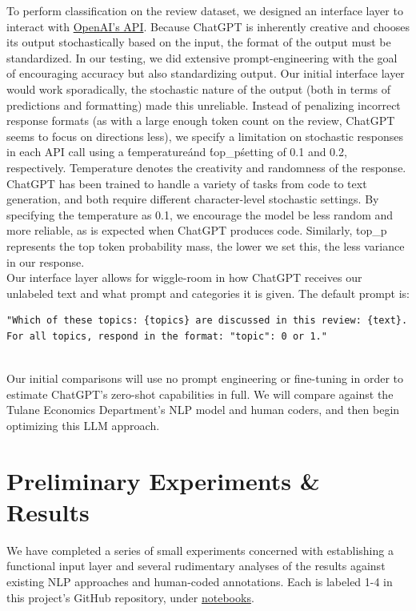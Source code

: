 \documentclass[12pt,a4paper]{article}
\begin{document}
\noindent To perform classification on the review dataset, we designed an interface layer to interact with \href{https://platform.openai.com/docs/overview}{OpenAI's API}. Because ChatGPT is inherently creative and chooses its output stochastically based on the input, the format of the output must be standardized. In our testing, we did extensive prompt-engineering with the goal of encouraging accuracy but also standardizing output. Our initial interface layer would work sporadically, the stochastic nature of the output (both in terms of predictions and formatting) made this unreliable. Instead of penalizing incorrect response formats (as with a large enough token count on the review, ChatGPT seems to focus on directions less), we specify a limitation on stochastic responses in each API call using a \'temperature\' and \'top\_p\' setting of 0.1 and 0.2, respectively. Temperature denotes the creativity and randomness of the response. ChatGPT has been trained to handle a variety of tasks from code to text generation, and both require different character-level stochastic settings. By specifying the temperature as 0.1, we encourage the model be less random and more reliable, as is expected when ChatGPT produces code. Similarly, top\_p represents the top token probability mass, the lower we set this, the less variance in our response. \\

\noindent Our interface layer allows for wiggle-room in how ChatGPT receives our unlabeled text and what prompt and categories it is given. The default prompt is: 

\begin{lstlisting}
"Which of these topics: {topics} are discussed in this review: {text}. 
For all topics, respond in the format: "topic": 0 or 1."
\end{lstlisting} \\

\noindent Our initial comparisons will use no prompt engineering or fine-tuning in order to estimate ChatGPT's zero-shot capabilities in full. We will compare against the Tulane Economics Department's NLP model and human coders, and then begin optimizing this LLM approach.


\section{Preliminary Experiments \& Results}\label{sec4}

\noindent We have completed a series of small experiments concerned with establishing a functional input layer and several rudimentary analyses of the results against existing NLP approaches and human-coded annotations. Each is labeled 1-4 in this project's GitHub repository, under \href{https://github.com/tulane-cmps6730/project-polititweet/tree/main/notebooks}{notebooks}.
\end{document}
